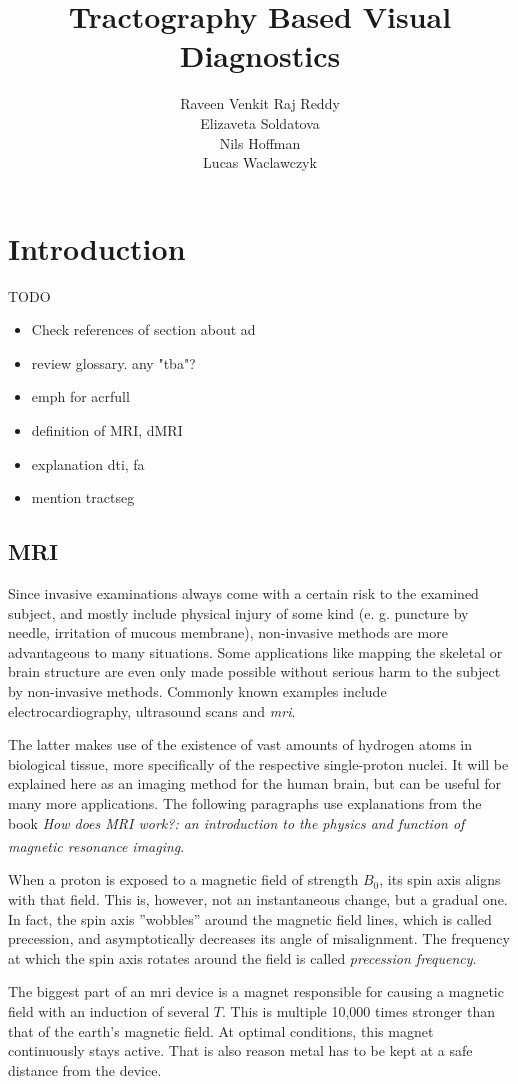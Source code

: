 \documentclass[plainreport]{cgvpub}
\author{Raveen Venkit Raj Reddy\\Elizaveta Soldatova\\Nils Hoffman\\Lucas Waclawczyk}
\title{Tractography Based Visual Diagnostics}
\newcommand{\newcite}[1]{\textsuperscript{\cite{#1}}}
\begin{document}
	\glsaddall
	\chapter{Introduction}
	TODO
	\begin{itemize}
		\item Check references of section about ad
		\item review glossary. any "tba"?
		\item emph for acrfull
		\item definition of MRI, dMRI
		\item explanation dti, fa
		\item mention tractseg
	\end{itemize}

	\section{\Gls{MRI}}
	Since invasive examinations always come with a certain risk to the examined subject, and mostly include physical injury of some kind (e. g. puncture by needle, irritation of mucous membrane), non-invasive methods are more advantageous to many situations. Some applications like mapping the skeletal or brain structure are even only made possible without serious harm to the subject by non-invasive methods. Commonly known examples include electrocardiography, ultrasound scans and \emph{\acrfull{mri}}.
	
	The latter makes use of the existence of vast amounts of hydrogen atoms in biological tissue, more specifically of the respective single-proton nuclei. It will be explained here as an imaging method for the human brain, but can be useful for many more applications. The following paragraphs use explanations from the book \emph{How does MRI work?: an introduction to the physics and function of magnetic resonance imaging}\newcite{mri}. 
	
	When a proton is exposed to a magnetic field  of strength $ B_{0} $, its spin axis aligns with that field. This is, however, not an instantaneous change, but a gradual one. In fact, the spin axis ''wobbles'' around the magnetic field lines, which is called precession, and asymptotically decreases its angle of misalignment. The frequency at which the spin axis rotates around the field is called \emph{precession frequency}. 
	
	The biggest part of an \acrshort{mri} device is a magnet responsible for causing a magnetic field with an induction of several $ T $. This is multiple 10,000 times stronger than that of the earth's magnetic field. At optimal conditions, this magnet continuously stays active. That is also reason metal has to be kept at a safe distance from the device.
	
\end{document}

